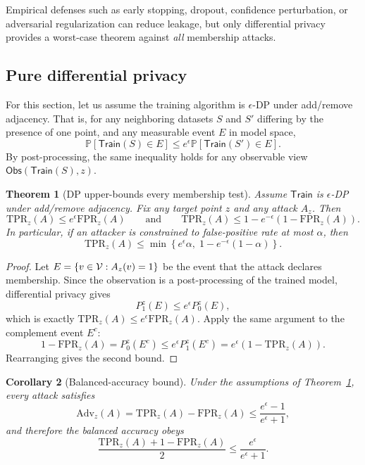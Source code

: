 \documentclass[11pt]{article}
\newtheorem{theorem}{Theorem}[section]
\newtheorem{corollary}[theorem]{Corollary}
\theoremstyle{definition}
\newcommand{\1}{\mathbf{1}}
\newcommand{\Train}{\mathsf{Train}}
\newcommand{\Obs}{\mathsf{Obs}}
\newcommand{\TPR}{\mathrm{TPR}}
\newcommand{\FPR}{\mathrm{FPR}}
\newcommand{\Adv}{\mathrm{Adv}}
\newcommand{\Pbb}{\mathbb{P}}
\begin{document}
Empirical defenses such as early stopping, dropout, confidence perturbation, or adversarial regularization can reduce leakage, but only differential privacy provides a worst-case theorem against \emph{all} membership attacks.

\subsection{Pure differential privacy}

For this section, let us assume the training algorithm is $\epsilon$-DP under add/remove adjacency. That is, for any neighboring datasets $S$ and $S'$ differing by the presence of one point, and any measurable event $E$ in model space,
\[
\Pbb[\Train(S) \in E] \le e^{\epsilon} \Pbb[\Train(S') \in E].
\]
By post-processing, the same inequality holds for any observable view $\Obs(\Train(S),z)$.

\begin{theorem}[DP upper-bounds every membership test]\label{thm:dp-roc}
Assume $\Train$ is $\epsilon$-DP under add/remove adjacency. Fix any target point $z$ and any attack $A_z$. Then
\[
\TPR_z(A) \le e^{\epsilon} \FPR_z(A)
\qquad\text{and}\qquad
\TPR_z(A) \le 1 - e^{-\epsilon}(1-\FPR_z(A)).
\]
In particular, if an attacker is constrained to false-positive rate at most $\alpha$, then
\[
\TPR_z(A) \le \min\!\left\{e^{\epsilon}\alpha,\; 1 - e^{-\epsilon}(1-\alpha)\right\}.
\]
\end{theorem}

\begin{proof}
Let $E = \{v \in {\cal V} : A_z(v)=1\}$ be the event that the attack declares membership. Since the observation is a post-processing of the trained model, differential privacy gives
\[
P_1^z(E) \le e^{\epsilon} P_0^z(E),
\]
which is exactly $\TPR_z(A) \le e^{\epsilon} \FPR_z(A)$. Apply the same argument to the complement event $E^c$:
\[
1-\FPR_z(A) = P_0^z(E^c) \le e^{\epsilon} P_1^z(E^c) = e^{\epsilon}(1-\TPR_z(A)).
\]
Rearranging gives the second bound.
\end{proof}

\begin{corollary}[Balanced-accuracy bound]
Under the assumptions of Theorem~\ref{thm:dp-roc}, every attack satisfies
\[
\Adv_z(A) = \TPR_z(A)-\FPR_z(A) \le \frac{e^{\epsilon}-1}{e^{\epsilon}+1},
\]
and therefore the balanced accuracy obeys
\[
\frac{\TPR_z(A) + 1 - \FPR_z(A)}{2} \le \frac{e^{\epsilon}}{e^{\epsilon}+1}.
\]
\end{corollary}
\end{document}
